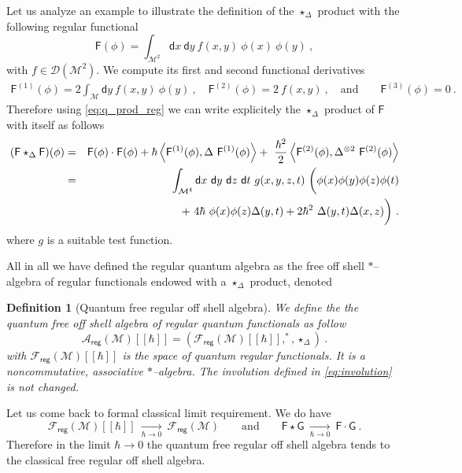 \documentclass[11pt]{book}
\newcommand{\reg}{\mathsf{reg}}
\newcommand{\sm}[1]{\left\langle#1\right\rangle}
\newcommand{\Acal}{\mathcal{A}}
\newcommand{\Dcal}{\mathcal{D}}
\newcommand{\Fcal}{\mathcal{F}}
\newcommand{\Mcal}{\mathcal{M}}
\newcommand{\Fsf}{\mathsf{F}}
\newcommand{\Gsf}{\mathsf{G}}
\newcommand{\dsf}{\mathsf{d}}
\theoremstyle{break}
\newtheorem{definition}{Definition}[chapter]
\begin{document}
Let us analyze an example to illustrate the definition of the $\star_\Delta$ product with the following regular functional
%
\begin{equation*}
\Fsf(\phi) = \int_{\Mcal^2} \dsf x \ \dsf y \ f(x,y) \ \phi(x) \ \phi(y) \ ,
\end{equation*}
%
with $f \in \Dcal(\Mcal^2)$. We compute its first and second functional derivatives
%
\begin{eqnarray*}
\Fsf^{(1)}(\phi) = 2 \int_\Mcal \dsf y \ f(x,y) \ \phi(y) \ , 
\quad 
\Fsf^{(2)}(\phi) = 2 \ f(x,y) \ , 
\quad \mbox{and} \qquad 
\Fsf^{(3)}(\phi) = 0 \ .
\end{eqnarray*}
%
Therefore using \eqref{eq:q_prod_reg} we can write explicitely the $\star_\Delta$ product of $\Fsf$ with itself as follows
%
\begin{eqnarray*}
(\Fsf \star_\Delta \Fsf)(\phi) &=& \Fsf(\phi) \cdot \Fsf(\phi) + \hbar \sm{ \Fsf^{(1)}(\phi) , \Delta \ \Fsf^{(1)}(\phi) } + \ \frac{\hbar^2}{2} \sm{ \Fsf^{(2)}(\phi) , \Delta^{\otimes 2} \ \Fsf^{(2)}(\phi)} \\
%
&=& \int_{\Mcal^4} \dsf x \ \dsf y \ \dsf z \ \dsf t \ g(x,y,z,t) \ \bigg( \phi(x) \phi(y) \phi(z) \phi(t) \\
&& \hspace*{60pt} + \ 4 \hbar \ \phi(x) \phi(z) \Delta(y,t) + 2 \hbar^2 \ \Delta(y,t) \Delta(x,z) \bigg) \ .
\end{eqnarray*}
%
where $g$ is a suitable test function. 


\bigskip


All in all we have defined the regular quantum algebra as the free off shell $\ast$--algebra of regular functionals endowed with a $\star_\Delta$ product, denoted


\begin{definition}[Quantum free regular off shell algebra]\label{def:alg_q_reg}
We define the the quantum free off shell algebra of regular quantum functionals as follow
%
\begin{equation*}
\Acal_\reg(\Mcal)[[\hbar]] = \left(\Fcal_\reg(\Mcal)[[\hbar]] , ^\ast , \star_{\Delta} \right) \ . 
\end{equation*}
%
with $\Fcal_\reg(\Mcal)[[\hbar]]$ is the space of quantum regular functionals. It is a noncommutative, associative $\ast$--algebra. The involution defined in \eqref{eq:involution} is not changed.
\end{definition}


Let us come back to formal classical limit requirement. We do have
%
\begin{equation*}
\Fcal_\reg(\Mcal)[[\hbar]] \ \underset{\hbar \to 0}{\longrightarrow} \ \Fcal_\reg(\Mcal)\qquad \mbox{and} \qquad \Fsf \star \Gsf \ \underset{\hbar \to 0}{\longrightarrow} \ \Fsf \cdot \Gsf \ . 
\end{equation*}
%
Therefore in the limit $\hbar \to 0$ the quantum free regular off shell algebra tends to the classical free regular off shell algebra.
\end{document}
